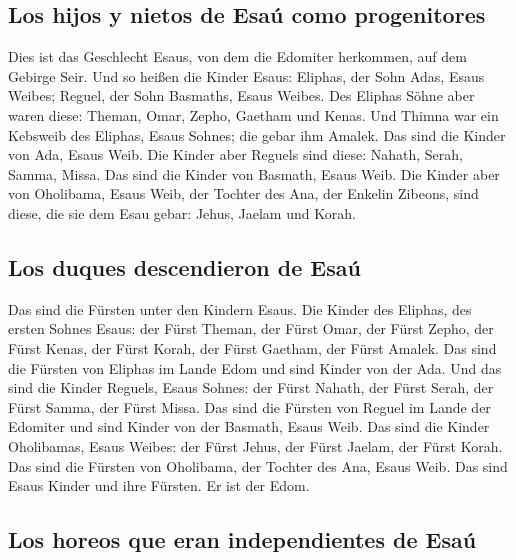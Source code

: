 \hypertarget{los-hijos-y-nietos-de-esauxfa-como-progenitores}{%
\subsection{Los hijos y nietos de Esaú como
progenitores}\label{los-hijos-y-nietos-de-esauxfa-como-progenitores}}

 Dies ist das Geschlecht Esaus, von dem die Edomiter
herkommen, auf dem Gebirge Seir.  Und so heißen die
Kinder Esaus: Eliphas, der Sohn Adas, Esaus Weibes; Reguel, der Sohn
Basmaths, Esaus Weibes.  Des Eliphas Söhne aber waren
diese: Theman, Omar, Zepho, Gaetham und Kenas.  Und
Thimna war ein Kebsweib des Eliphas, Esaus Sohnes; die gebar ihm Amalek.
Das sind die Kinder von Ada, Esaus Weib.  Die Kinder aber
Reguels sind diese: Nahath, Serah, Samma, Missa. Das sind die Kinder von
Basmath, Esaus Weib.  Die Kinder aber von Oholibama,
Esaus Weib, der Tochter des Ana, der Enkelin Zibeons, sind diese, die
sie dem Esau gebar: Jehus, Jaelam und Korah.

\hypertarget{los-duques-descendieron-de-esauxfa}{%
\subsection{Los duques descendieron de
Esaú}\label{los-duques-descendieron-de-esauxfa}}

 Das sind die Fürsten unter den Kindern Esaus. Die Kinder
des Eliphas, des ersten Sohnes Esaus: der Fürst Theman, der Fürst Omar,
der Fürst Zepho, der Fürst Kenas,  der Fürst Korah, der
Fürst Gaetham, der Fürst Amalek. Das sind die Fürsten von Eliphas im
Lande Edom und sind Kinder von der Ada.  Und das sind die
Kinder Reguels, Esaus Sohnes: der Fürst Nahath, der Fürst Serah, der
Fürst Samma, der Fürst Missa. Das sind die Fürsten von Reguel im Lande
der Edomiter und sind Kinder von der Basmath, Esaus Weib.
 Das sind die Kinder Oholibamas, Esaus Weibes: der Fürst
Jehus, der Fürst Jaelam, der Fürst Korah. Das sind die Fürsten von
Oholibama, der Tochter des Ana, Esaus Weib.  Das sind
Esaus Kinder und ihre Fürsten. Er ist der Edom.

\hypertarget{los-horeos-que-eran-independientes-de-esauxfa}{%
\subsection{Los horeos que eran independientes de
Esaú}\label{los-horeos-que-eran-independientes-de-esauxfa}}

